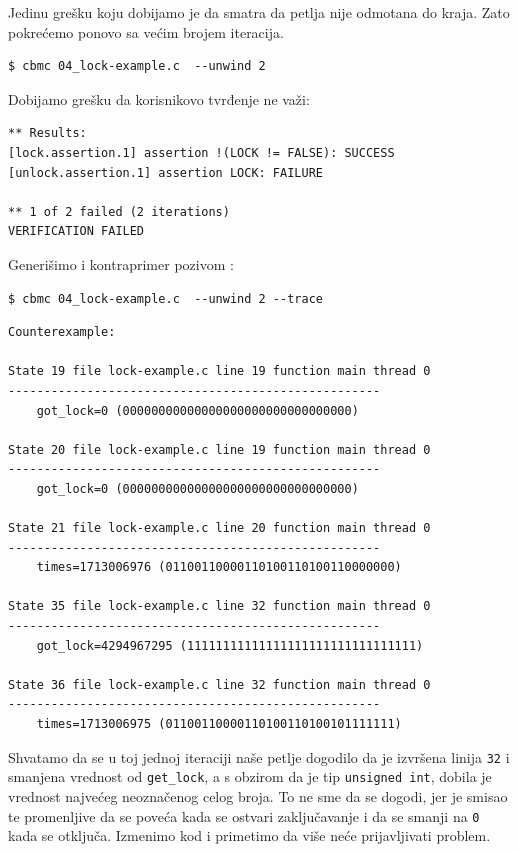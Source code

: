 Jedinu grešku koju dobijamo je da smatra da petlja nije odmotana do kraja. Zato pokrećemo ponovo sa većim brojem iteracija.

\begin{verbatim}
$ cbmc 04_lock-example.c  --unwind 2
\end{verbatim}

Dobijamo grešku da korisnikovo tvrđenje ne važi:

\begin{verbatim}
** Results:
[lock.assertion.1] assertion !(LOCK != FALSE): SUCCESS
[unlock.assertion.1] assertion LOCK: FAILURE

** 1 of 2 failed (2 iterations)
VERIFICATION FAILED
\end{verbatim}

Generišimo i kontraprimer pozivom :

\begin{verbatim}
$ cbmc 04_lock-example.c  --unwind 2 --trace
\end{verbatim}

\begin{verbatim}
Counterexample:

State 19 file lock-example.c line 19 function main thread 0
----------------------------------------------------
    got_lock=0 (00000000000000000000000000000000)

State 20 file lock-example.c line 19 function main thread 0
----------------------------------------------------
    got_lock=0 (00000000000000000000000000000000)

State 21 file lock-example.c line 20 function main thread 0
----------------------------------------------------
    times=1713006976 (01100110000110100110100110000000)

State 35 file lock-example.c line 32 function main thread 0
----------------------------------------------------
    got_lock=4294967295 (11111111111111111111111111111111)

State 36 file lock-example.c line 32 function main thread 0
----------------------------------------------------
    times=1713006975 (01100110000110100110100101111111)
\end{verbatim}

Shvatamo da se u toj jednoj iteraciji naše petlje dogodilo da je izvršena linija \texttt{32} i smanjena vrednost od \texttt{get\_lock}, a s obzirom da je tip \texttt{unsigned\ int}, dobila je vrednost najvećeg neoznačenog celog broja. To ne sme da se dogodi, jer je smisao te promenljive da se poveća kada se ostvari zaključavanje i da se smanji na \texttt{0} kada se otključa. Izmenimo kod i primetimo da više neće prijavljivati problem.

